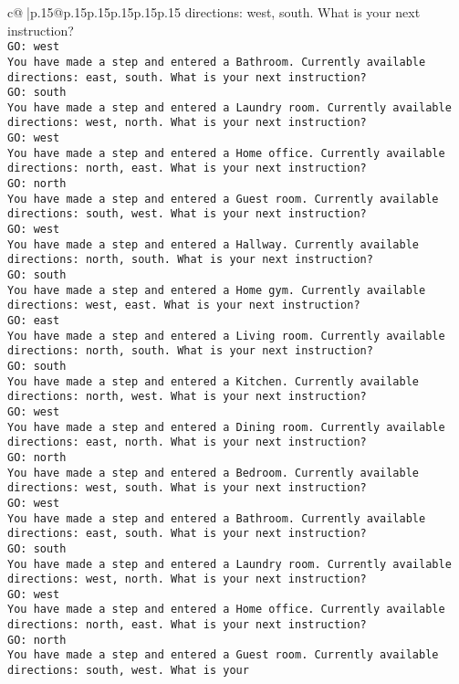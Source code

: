 \documentclass{article}
\begin{document}
{\begin{supertabular}{c@{$\;$}|p{.15\linewidth}@{}p{.15\linewidth}p{.15\linewidth}p{.15\linewidth}p{.15\linewidth}p{.15\linewidth}}
{{{directions: west, south. What is your next instruction?\\ \tt GO: west\\ \tt You have made a step and entered a Bathroom. Currently available directions: east, south. What is your next instruction?\\ \tt GO: south\\ \tt You have made a step and entered a Laundry room. Currently available directions: west, north. What is your next instruction?\\ \tt GO: west\\ \tt You have made a step and entered a Home office. Currently available directions: north, east. What is your next instruction?\\ \tt GO: north\\ \tt You have made a step and entered a Guest room. Currently available directions: south, west. What is your next instruction?\\ \tt GO: west\\ \tt You have made a step and entered a Hallway. Currently available directions: north, south. What is your next instruction?\\ \tt GO: south\\ \tt You have made a step and entered a Home gym. Currently available directions: west, east. What is your next instruction?\\ \tt GO: east\\ \tt You have made a step and entered a Living room. Currently available directions: north, south. What is your next instruction?\\ \tt GO: south\\ \tt You have made a step and entered a Kitchen. Currently available directions: north, west. What is your next instruction?\\ \tt GO: west\\ \tt You have made a step and entered a Dining room. Currently available directions: east, north. What is your next instruction?\\ \tt GO: north\\ \tt You have made a step and entered a Bedroom. Currently available directions: west, south. What is your next instruction?\\ \tt GO: west\\ \tt You have made a step and entered a Bathroom. Currently available directions: east, south. What is your next instruction?\\ \tt GO: south\\ \tt You have made a step and entered a Laundry room. Currently available directions: west, north. What is your next instruction?\\ \tt GO: west\\ \tt You have made a step and entered a Home office. Currently available directions: north, east. What is your next instruction?\\ \tt GO: north\\ \tt You have made a step and entered a Guest room. Currently available directions: south, west. What is your }}}
\end{supertabular}}
\end{document}
